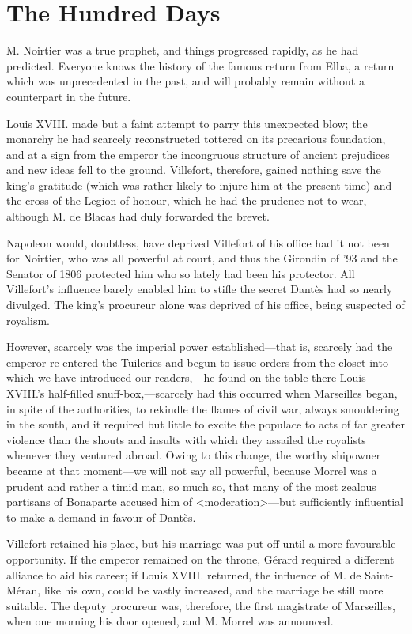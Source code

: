 \chapter{The Hundred Days} 
	
	\lettrine{M}{.} Noirtier was a true prophet, and things progressed rapidly, as he had predicted. Everyone knows the history of the famous return from Elba, a return which was unprecedented in the past, and will probably remain without a counterpart in the future. 

 Louis XVIII. made but a faint attempt to parry this unexpected blow; the monarchy he had scarcely reconstructed tottered on its precarious foundation, and at a sign from the emperor the incongruous structure of ancient prejudices and new ideas fell to the ground. Villefort, therefore, gained nothing save the king's gratitude (which was rather likely to injure him at the present time) and the cross of the Legion of honour, which he had the prudence not to wear, although M. de Blacas had duly forwarded the brevet. 

 Napoleon would, doubtless, have deprived Villefort of his office had it not been for Noirtier, who was all powerful at court, and thus the Girondin of '93 and the Senator of 1806 protected him who so lately had been his protector. All Villefort's influence barely enabled him to stifle the secret Dantès had so nearly divulged. The king's procureur alone was deprived of his office, being suspected of royalism. 

 However, scarcely was the imperial power established—that is, scarcely had the emperor re-entered the Tuileries and begun to issue orders from the closet into which we have introduced our readers,—he found on the table there Louis XVIII.'s half-filled snuff-box,—scarcely had this occurred when Marseilles began, in spite of the authorities, to rekindle the flames of civil war, always smouldering in the south, and it required but little to excite the populace to acts of far greater violence than the shouts and insults with which they assailed the royalists whenever they ventured abroad.  Owing to this change, the worthy shipowner became at that moment—we will not say all powerful, because Morrel was a prudent and rather a timid man, so much so, that many of the most zealous partisans of Bonaparte accused him of <moderation>—but sufficiently influential to make a demand in favour of Dantès. 

 Villefort retained his place, but his marriage was put off until a more favourable opportunity. If the emperor remained on the throne, Gérard required a different alliance to aid his career; if Louis XVIII. returned, the influence of M. de Saint-Méran, like his own, could be vastly increased, and the marriage be still more suitable. The deputy procureur was, therefore, the first magistrate of Marseilles, when one morning his door opened, and M. Morrel was announced. 

